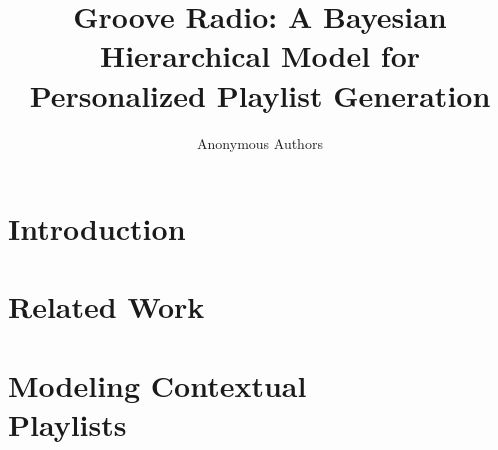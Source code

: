 \documentclass{sig-alternate}
\title{Groove Radio: A Bayesian Hierarchical Model for Personalized Playlist Generation
\GLw{Current version is just over 9 pages without comments}}
\begin{document}


\author{
	\alignauthor
	Anonymous Authors\\
	\alignauthor
}



\maketitle


\begin{abstract}
	
\end{abstract}
\section{Introduction}
\label{sec:Introduction}
   
\section{Related Work}
\label{sec:Related}
    
\section{Modeling Contextual\\ Playlists}
\label{sec:ourapproach}
    
\end{document}
